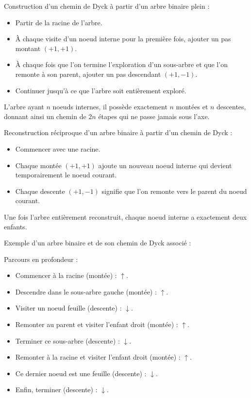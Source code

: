 \documentclass[10pt,a4paper]{article}
\begin{document}
\begin{enumerate}
    Construction d'un chemin de Dyck à partir d'un arbre binaire plein :
    \begin{itemize}
        \item Partir de la racine de l'arbre.
        \item À chaque visite d'un noeud interne pour la première fois, ajouter un pas montant \(
        (+1,+1) \).
        \item À chaque fois que l'on termine l'exploration d'un sous-arbre et que l'on remonte à son
        parent, ajouter un pas descendant \( (+1,-1) \).
        \item Continuer jusqu'à ce que l'arbre soit entièrement exploré.
    \end{itemize}

    L'arbre ayant \( n \) noeuds internes, il possède exactement \( n \) montées et \( n \)
    descentes, donnant ainsi un chemin de \( 2n \) étapes qui ne passe jamais sous l'axe.

    Reconstruction réciproque d'un arbre binaire à partir d'un chemin de Dyck :
    \begin{itemize}
        \item Commencer avec une racine.
        \item Chaque montée \( (+1,+1) \) ajoute un nouveau noeud interne qui devient temporairement
        le noeud courant.
        \item Chaque descente \( (+1,-1) \) signifie que l'on remonte vers le parent du noeud
        courant.
    \end{itemize}
    Une fois l'arbre entièrement reconstruit, chaque noeud interne a exactement deux
    enfants.

    Exemple d'un arbre binaire et de son chemin de Dyck associé :
    \begin{center}
        
    \end{center}

    Parcours en profondeur :
    \begin{itemize}
        \item Commencer à la racine (montée) : \( \uparrow \).
        \item Descendre dans le sous-arbre gauche (montée) : \( \uparrow \).
        \item Visiter un noeud feuille (descente) : \( \downarrow \).
        \item Remonter au parent et visiter l'enfant droit (montée) : \( \uparrow \).
        \item Terminer ce sous-arbre (descente) : \( \downarrow \).
        \item Remonter à la racine et visiter l'enfant droit (montée) : \( \uparrow \).
        \item Ce dernier noeud est une feuille (descente) : \( \downarrow \).
        \item Enfin, terminer (descente) : \( \downarrow \).
    \end{itemize}


\end{enumerate}
\end{document}

